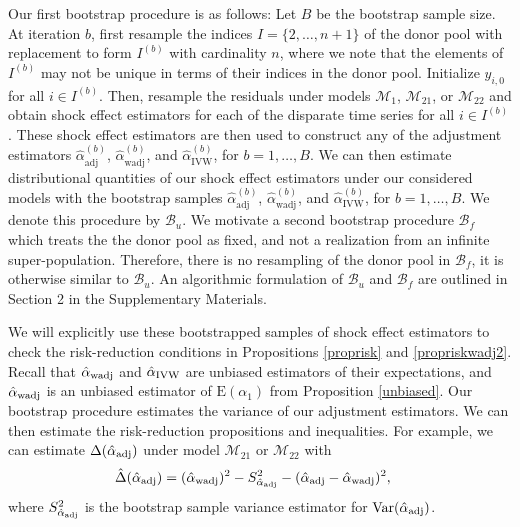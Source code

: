 \documentclass[11pt]{article}
\def\mrm#1{\mathrm{#1}} %
\def\mc#1{\mathcal{#1}} %
\def\E#1{\mathrm{E}(#1)} %
\def\var#1{\mathrm{Var}(#1)} %
\DeclareMathOperator{\Var}{Var} %
\theoremstyle{definition}
\begin{document}
Our first bootstrap procedure is as follows: Let $B$ be the bootstrap sample size. At iteration $b$, first resample the indices $I = \{2, \ldots, n+1\}$ of the donor pool with replacement to form $I^{(b)}$ with cardinality $n$, where we note that the elements of $I^{(b)}$ may not be unique in terms of their  indices in the donor pool. Initialize $y_{i,0}$ for all $i \in I^{(b)}$. Then, resample the residuals under models $\mc{M}_1$, $\mc{M}_{21}$, or $\mc{M}_{22}$ and obtain shock effect estimators for each of the disparate time series for all $i \in I^{(b)}$. These shock effect estimators are then used to construct any of the adjustment estimators $\hat{\alpha}^{(b)}_{\mrm{adj}}$, $\hat{\alpha}^{(b)}_{\mrm{wadj}}$, and $\hat{\alpha}^{(b)}_{\mrm{IVW}}$, for $b = 1,\ldots,B$. We can then estimate distributional quantities of our shock effect estimators under our considered models with the bootstrap samples $\hat{\alpha}^{(b)}_{\mrm{adj}}$, $\hat{\alpha}^{(b)}_{\mrm{wadj}}$, and $\hat{\alpha}^{(b)}_{\mrm{IVW}}$, for $b = 1,\ldots,B$. We denote this procedure by $\mc{B}_u$. We motivate a second bootstrap procedure $\mc{B}_f$ which treats the the donor pool as fixed, and not a realization from an infinite super-population. Therefore, there is no resampling of the donor pool in $\mc{B}_f$, it is otherwise similar to $\mc{B}_u$. An algorithmic formulation of $\mc{B}_u$ and $\mc{B}_f$  are outlined in Section 2 in the Supplementary Materials.

We will explicitly use these bootstrapped samples of shock effect estimators to check the risk-reduction conditions in Propositions \ref{proprisk} and \ref{propriskwadj2}. Recall that  $\hat{\alpha}_{\rm wadj}$ and $\hat{\alpha}_{\rm IVW}$ are unbiased estimators of their expectations, and $\hat{\alpha}_{\rm wadj}$ is an unbiased estimator of $\E{\alpha_1}$ from Proposition \ref{unbiased}. Our bootstrap procedure estimates the variance of our adjustment estimators. We can then estimate the risk-reduction propositions and inequalities. For example, we can estimate $\Delta(\hat{\alpha}_{\rm adj})$ under model $\mc{M}_{21}$ or $\mc{M}_{22}$ with 
\begin{align*}
  \hat{\Delta}(\hat{\alpha}_{\rm adj}) & = (\hat{\alpha}_{\rm wadj})^2 -S^2_{\hat{\alpha}_{\rm adj}} -(\hat{\alpha}_{\rm adj}-\hat{\alpha}_{\rm wadj})^2,
\end{align*}
where $S^2_{\hat{\alpha}_{\rm adj}}$ is the bootstrap sample variance estimator for $\Var(\hat{\alpha}_{\rm adj})$. 
\end{document}
